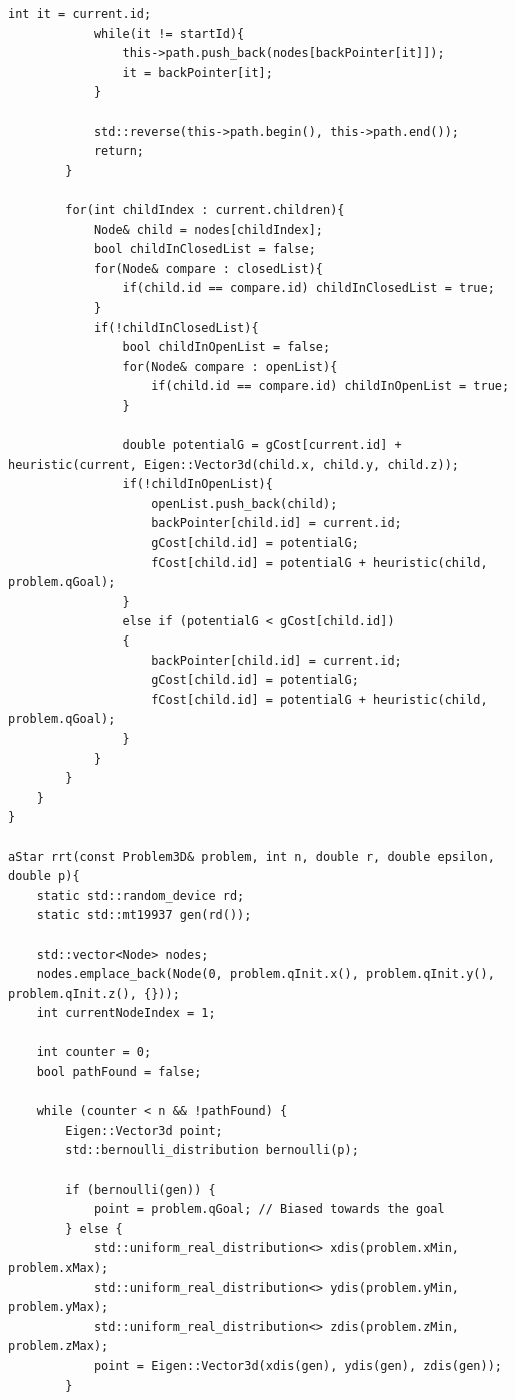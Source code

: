 \documentclass{article}
\begin{document}
\begin{lstlisting}[style=cppstyle]
            int it = current.id;
            while(it != startId){
                this->path.push_back(nodes[backPointer[it]]);
                it = backPointer[it];
            }

            std::reverse(this->path.begin(), this->path.end());
            return;
        }

        for(int childIndex : current.children){
            Node& child = nodes[childIndex];
            bool childInClosedList = false;
            for(Node& compare : closedList){
                if(child.id == compare.id) childInClosedList = true;
            }
            if(!childInClosedList){
                bool childInOpenList = false;
                for(Node& compare : openList){
                    if(child.id == compare.id) childInOpenList = true;
                }

                double potentialG = gCost[current.id] + heuristic(current, Eigen::Vector3d(child.x, child.y, child.z));
                if(!childInOpenList){
                    openList.push_back(child);
                    backPointer[child.id] = current.id;
                    gCost[child.id] = potentialG;
                    fCost[child.id] = potentialG + heuristic(child, problem.qGoal); 
                } 
                else if (potentialG < gCost[child.id])
                {
                    backPointer[child.id] = current.id;
                    gCost[child.id] = potentialG;
                    fCost[child.id] = potentialG + heuristic(child, problem.qGoal);  
                }
            }
        }
    }
}

aStar rrt(const Problem3D& problem, int n, double r, double epsilon, double p){
    static std::random_device rd;
    static std::mt19937 gen(rd());

    std::vector<Node> nodes;
    nodes.emplace_back(Node(0, problem.qInit.x(), problem.qInit.y(), problem.qInit.z(), {}));
    int currentNodeIndex = 1;

    int counter = 0;
    bool pathFound = false;

    while (counter < n && !pathFound) {
        Eigen::Vector3d point;
        std::bernoulli_distribution bernoulli(p);

        if (bernoulli(gen)) {
            point = problem.qGoal; // Biased towards the goal
        } else {
            std::uniform_real_distribution<> xdis(problem.xMin, problem.xMax);
            std::uniform_real_distribution<> ydis(problem.yMin, problem.yMax);
            std::uniform_real_distribution<> zdis(problem.zMin, problem.zMax);
            point = Eigen::Vector3d(xdis(gen), ydis(gen), zdis(gen));
        }


\end{lstlisting}
\end{document}
